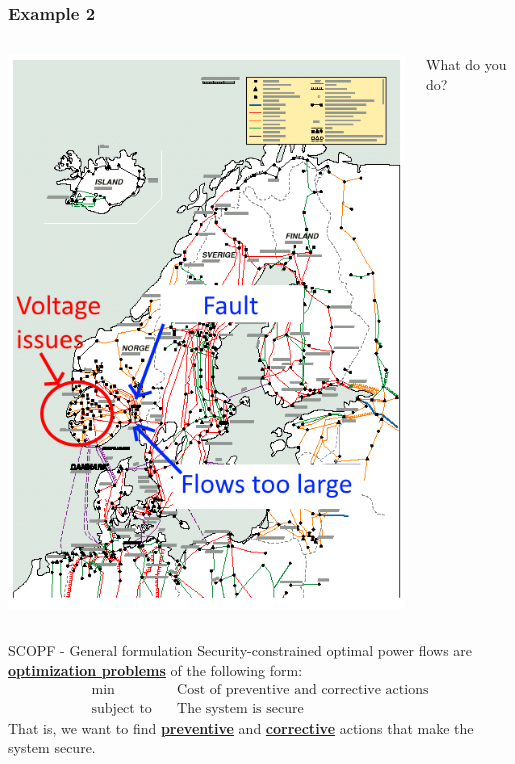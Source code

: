\documentclass[compress]{beamer}
\newcommand*{\emphc}[1]{\textbf{\underline{#1}}}
\begin{document}
\begin{frame}
  \frametitle{Example 2}
  \begin{columns}
    \begin{column}{0.6\textwidth}
\includegraphics[width=\textwidth]{Figs/NordicPS_fault.png}
    \end{column}
    \begin{column}{0.3\textwidth}
      What do you do?
    \end{column}
  \end{columns}
\end{frame}

\begin{frame}{SCOPF - General formulation}
Security-constrained optimal power flows are \emphc{optimization problems} of the following form:
\vskip0.5cm
  \begin{align}
    \min & \quad \text{Cost of preventive and corrective actions} \\
    \text{subject to} & \quad \text{The system is secure}
  \end{align}
\vskip0.5cm
That is, we want to find \emphc{preventive} and \emphc{corrective} actions that make the system secure.
\end{frame}
\end{document}
